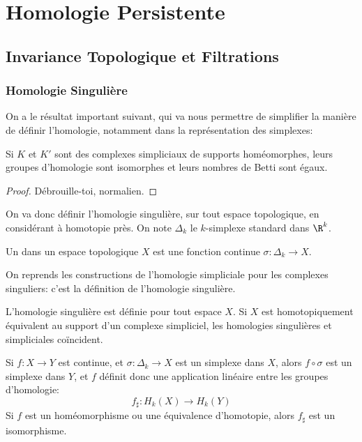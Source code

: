 \section{Homologie Persistente}
\subsection{Invariance Topologique et Filtrations}
\subsubsection{Homologie Singulière}
On a le résultat important suivant, qui va nous permettre de simplifier la manière de définir l'homologie,
notamment dans la représentation des simplexes:
\begin{thm}
	Si $K$ et $K'$ sont des complexes simpliciaux de supports homéomorphes, leurs groupes d'homologie sont
	isomorphes et leurs nombres de Betti sont égaux.
\end{thm}
\begin{proof}
	\og Débrouille-toi, normalien.\fg
\end{proof}

On va donc définir l'homologie singulière, sur tout espace topologique, en considérant à homotopie près. On note $\Delta_{k}$ le $k$-simplexe standard dans $\R^{k}$.
\begin{definition}
	Un  dans un espace topologique $X$ est une fonction continue $\sigma: \Delta_{k}\to X$.
\end{definition}

On reprends les constructions de l'homologie simpliciale pour les complexes singuliers: c'est la définition de l'homologie singulière.

\begin{proposition}
	L'homologie singulière est définie pour tout espace $X$. Si $X$ est homotopiquement équivalent au support
	d'un complexe simpliciel, les homologies singulières et simpliciales coïncident.
\end{proposition}

\begin{proposition}
	Si $f: X \to Y$ est continue, et $\sigma: \Delta_{k} \to X$ est un simplexe dans $X$, alors $f\circ \sigma$ est un simplexe dans $Y$, et $f$ définit donc une application linéaire entre les groupes d'homologie:
	\begin{equation*}
		f_{\sharp}: H_{k}(X) \to H_{k}(Y)
	\end{equation*}
	Si $f$ est un homéomorphisme ou une équivalence d'homotopie, alors $f_{\sharp}$ est un isomorphisme.
\end{proposition}

